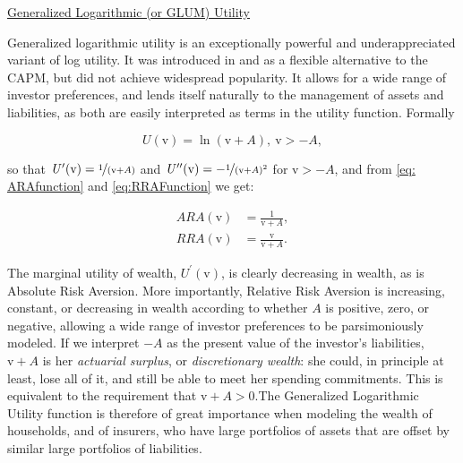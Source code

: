 \documentclass[graybox,envcountchap,sectrefs]{svmono}\usepackage[]{graphicx}\usepackage[]{xcolor}
\begin{document}
\begin{appendices}
\medskip{}

\uline{Generalized Logarithmic (or GLUM) Utility}

Generalized logarithmic utility is an exceptionally powerful and underappreciated
variant of log utility. It was introduced in \citet{Rubinstein1976}
and \citet{Rubinstein1977} as a flexible alternative to the CAPM,
but did not achieve widespread popularity. It allows for a wide range
of investor preferences, and lends itself naturally to the management
of assets and liabilities, as both are easily interpreted as terms
in the utility function. Formally

\begin{equation}
\mathit{U}(\mathit{\mathrm{v}})=\ln(\mathrm{v}+A),\ \mathrm{v}>-A,\label{eq:GLUMUtility}
\end{equation}

so that $\mathit{U^{\prime}}(\mathit{\mathrm{v}})=\nicefrac{1}{\left(\mathit{\mathrm{v}}+A\right)}$
and $\mathit{U^{\prime\prime}}(\mathit{\mathrm{v}})=-\nicefrac{1}{\left(\mathit{\mathrm{v}}+A\right)^{2}}$
for $\mathrm{v}>-A$, and from \eqref{eq: ARAfunction} and \eqref{eq:RRAFunction}
we get:

\begin{subequations}
\begin{align}
ARA\left(\mathrm{v}\right) & =\frac{1}{\mathrm{v}+A},\label{eq:ARAGLUMUtility}\\
RRA\left(\mathrm{v}\right) & =\frac{\mathrm{v}}{\mathrm{v}+A}.\label{eq:RRAGLUMUtility}
\end{align}
\end{subequations}

The marginal utility of wealth, $\mathit{U^{\prime}}(\mathit{\mathrm{v}})$,
is clearly decreasing in wealth, as is Absolute Risk Aversion. More
importantly, Relative Risk Aversion is increasing, constant, or decreasing
in wealth according to whether $A$ is positive, zero, or negative,
allowing a wide range of investor preferences to be parsimoniously
modeled. If we interpret $-A$ as the present value of the investor's
liabilities, $\mathrm{v}+A$ is her \emph{actuarial surplus}, or \emph{discretionary
wealth}: she could, in principle at least, lose all of it, and still
be able to meet her spending commitments. This is equivalent to the
requirement that $\mathrm{v}+A>0$.The Generalized Logarithmic Utility
function is therefore of great importance when modeling the wealth
of households, and of insurers, who have large portfolios of assets
that are offset by similar large portfolios of liabilities.


\end{appendices}
\end{document}
